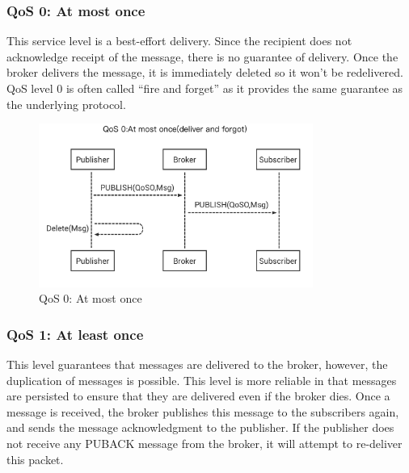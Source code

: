 \documentclass[\main/thesis.tex]{subfiles}
\begin{document}
\subsubsection{QoS 0: At most once}
This service level is a best-effort delivery. Since the recipient does not acknowledge receipt of the message, there is no guarantee of delivery. Once the broker delivers the message, it is immediately deleted so it won't be redelivered. QoS level 0 is often called “fire and forget” as it provides the same guarantee as the underlying protocol.
\begin{figure}[H]
    \begin{center}
        \includegraphics[width=0.8\textwidth]{mqtt_qos_at_most_once.png}
    \end{center}
    \caption{QoS 0: At most once}
    \label{fig:mqtt_qos_0}
\end{figure}

\subsubsection{QoS 1: At least once}
This level guarantees that messages are delivered to the broker, however, the duplication of messages is possible. This level is more reliable in that messages are persisted to ensure that they are delivered even if the broker dies. Once a message is received, the broker publishes this message to the subscribers again, and sends the message acknowledgment to the publisher. If the publisher does not receive any PUBACK message from the broker, it will attempt to re-deliver this packet.

\end{document}
